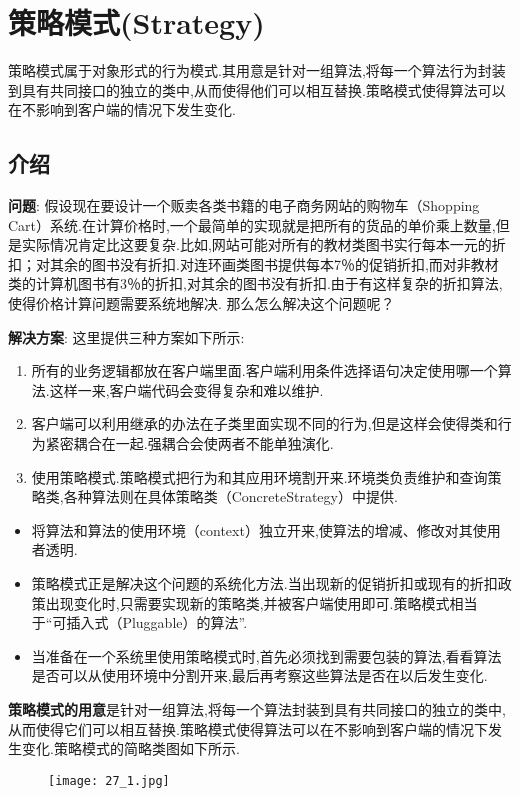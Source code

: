 \documentclass[../main.tex]{subfiles}
\begin{document}
\section{策略模式(Strategy)}
策略模式属于对象形式的行为模式.其用意是针对一组算法,将每一个算法行为封装到具有共同接口的独立的类中,从而使得他们可以相互替换.策略模式使得算法可以在不影响到客户端的情况下发生变化.
%
\subsection{介绍}
\textbf{问题}:
假设现在要设计一个贩卖各类书籍的电子商务网站的购物车（Shopping Cart）系统.在计算价格时,一个最简单的实现就是把所有的货品的单价乘上数量,但是实际情况肯定比这要复杂.比如,网站可能对所有的教材类图书实行每本一元的折扣；对其余的图书没有折扣.对连环画类图书提供每本7％的促销折扣,而对非教材类的计算机图书有3％的折扣,对其余的图书没有折扣.由于有这样复杂的折扣算法,使得价格计算问题需要系统地解决.
那么怎么解决这个问题呢？

\textbf{解决方案}:
这里提供三种方案如下所示:
%
\begin{enumerate}
  \item 所有的业务逻辑都放在客户端里面.客户端利用条件选择语句决定使用哪一个算法.这样一来,客户端代码会变得复杂和难以维护.
  \item 客户端可以利用继承的办法在子类里面实现不同的行为,但是这样会使得类和行为紧密耦合在一起.强耦合会使两者不能单独演化.
  \item 使用策略模式.策略模式把行为和其应用环境割开来.环境类负责维护和查询策略类,各种算法则在具体策略类（ConcreteStrategy）中提供.
\end{enumerate}
%
\begin{itemize}
  \item 将算法和算法的使用环境（context）独立开来,使算法的增减、修改对其使用者透明.
  \item 策略模式正是解决这个问题的系统化方法.当出现新的促销折扣或现有的折扣政策出现变化时,只需要实现新的策略类,并被客户端使用即可.策略模式相当于``可插入式（Pluggable）的算法''.
  \item 当准备在一个系统里使用策略模式时,首先必须找到需要包装的算法,看看算法是否可以从使用环境中分割开来,最后再考察这些算法是否在以后发生变化.
\end{itemize}
%
\textbf{策略模式的用意}是针对一组算法,将每一个算法封装到具有共同接口的独立的类中,从而使得它们可以相互替换.策略模式使得算法可以在不影响到客户端的情况下发生变化.策略模式的简略类图如下所示.
%
\begin{figure}[H]
  \texttt{[image: 27\_1.jpg]}
\end{figure}
%
\end{document}
